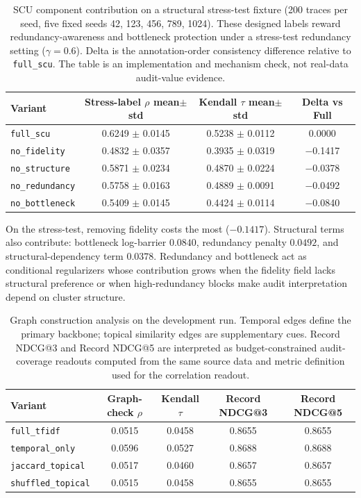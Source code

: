 \documentclass[pdflatex,sn-mathphys-num,iicol]{sn-jnl}
\begin{document}
\begin{table}[ht]
\caption{SCU component contribution on a structural stress-test fixture (200 traces per seed, five fixed seeds 42, 123, 456, 789, 1024). These designed labels reward redundancy-awareness and bottleneck protection under a stress-test redundancy setting ($\gamma=0.6$). Delta is the annotation-order consistency difference relative to \texttt{full\_scu}. The table is an implementation and mechanism check, not real-data audit-value evidence.}
\label{tab:scu-stress-test}
\centering
\small
\renewcommand{\arraystretch}{1.08}
\begin{tabular}{lccc}
\toprule
\textbf{Variant} & \textbf{Stress-label $\rho$ mean$\pm$std} & \textbf{Kendall $\tau$ mean$\pm$std} & \textbf{Delta vs Full} \\
\midrule
\texttt{full\_scu} & 0.6249 $\pm$ 0.0145 & 0.5238 $\pm$ 0.0112 & 0.0000 \\
\texttt{no\_fidelity} & 0.4832 $\pm$ 0.0357 & 0.3935 $\pm$ 0.0319 & $-$0.1417 \\
\texttt{no\_structure} & 0.5871 $\pm$ 0.0234 & 0.4870 $\pm$ 0.0224 & $-$0.0378 \\
\texttt{no\_redundancy} & 0.5758 $\pm$ 0.0163 & 0.4889 $\pm$ 0.0091 & $-$0.0492 \\
\texttt{no\_bottleneck} & 0.5409 $\pm$ 0.0145 & 0.4424 $\pm$ 0.0114 & $-$0.0840 \\
\bottomrule
\end{tabular}
\end{table}

On the stress-test, removing fidelity costs the most ($-0.1417$). Structural terms also contribute: bottleneck log-barrier $0.0840$, redundancy penalty $0.0492$, and structural-dependency term $0.0378$. Redundancy and bottleneck act as conditional regularizers whose contribution grows when the fidelity field lacks structural preference or when high-redundancy blocks make audit interpretation depend on cluster structure.

\begin{table}[ht]
\caption{Graph construction analysis on the development run. Temporal edges define the primary backbone; topical similarity edges are supplementary cues. Record NDCG@3 and Record NDCG@5 are interpreted as budget-constrained audit-coverage readouts computed from the same source data and metric definition used for the correlation readout.}
\label{tab:graph-construction-analysis}
\centering
\small
\renewcommand{\arraystretch}{1.08}
\begin{tabular}{lcccc}
\toprule
\textbf{Variant} & \textbf{Graph-check $\rho$} & \textbf{Kendall $\tau$} & \textbf{Record NDCG@3} & \textbf{Record NDCG@5} \\
\midrule
\texttt{full\_tfidf} & 0.0515 & 0.0458 & 0.8655 & 0.8655 \\
\texttt{temporal\_only} & 0.0596 & 0.0527 & 0.8688 & 0.8688 \\
\texttt{jaccard\_topical} & 0.0517 & 0.0460 & 0.8657 & 0.8657 \\
\texttt{shuffled\_topical} & 0.0515 & 0.0458 & 0.8655 & 0.8655 \\
\bottomrule
\end{tabular}
\end{table}
\end{document}
